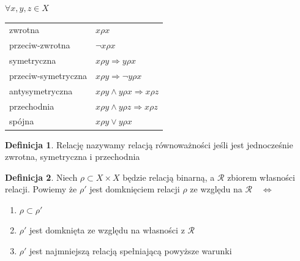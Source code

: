 \documentclass[12pt,a4paper]{article}
\theoremstyle{definition}
\newtheorem{df}{Definicja}
\begin{document}
$\forall x,y,z \in X$
\begin{listliketab}
\begin{tabular}{ll}
	\textbullet  zwrotna & $x \rho x$ \\
	\textbullet  przeciw-zwrotna & $\neg x\rho x$ \\
	\textbullet  symetryczna & $x\rho y \Rightarrow y\rho x$ \\
	\textbullet  przeciw-symetryczna & $x \rho y \Rightarrow \neg y\rho x $ \\
	\textbullet  antysymetryczna & $x\rho y \wedge y\rho x \Rightarrow x\rho z$ \\
	\textbullet  przechodnia & $x\rho y \wedge y\rho z \Rightarrow x\rho z$ \\
	\textbullet  spójna & $ x\rho y \vee y\rho x $ \\
\end{tabular}
\end{listliketab}

\begin{df}
Relację nazywamy relacją równoważności jeśli jest jednocześnie zwrotna, symetryczna i przechodnia
\end{df}

\begin{df}
Niech $\rho\subset X\times X$ będzie relacją binarną, a $\mathcal{R}$ zbiorem własności relacji. Powiemy że $\rho'$ jest domknięciem relacji $\rho$
ze względu na $\mathcal{R} \quad \Leftrightarrow$
\begin{enumerate}
	\item $\rho \subset \rho'$
	\item $\rho'$ jest domknięta ze względu na własności z $\mathcal{R}$
	\item $\rho'$ jest najmniejszą relacją spełniającą powyższe warunki
\end{enumerate}
\end{df}
\end{document}
